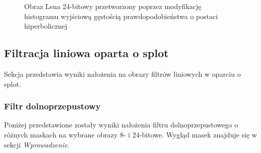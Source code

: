 \documentclass{classrep}
\begin{document}
\begin{figure}[H]%
    \centering
    \qquad
    \qquad
    \qquad
    \caption{Obraz Lena 24-bitowy przetworzony poprzez modyfikację histogramu wyjściową gęstością prawdopodobieństwa o postaci hiperbolicznej}%
\end{figure}

\subsection{Filtracja liniowa oparta o splot}
Sekcja przedstawia wyniki nałożenia na obrazy filtrów liniowych w oparciu o splot.

\subsubsection{Filtr dolnoprzepustowy}
Poniżej przedstawione zostały wyniki nałożenia filtru dolnoprzepustowego o różnych maskach na wybrane obrazy 8- i 24-bitowe. Wygląd masek znajduje się w sekcji \textit{Wprowadzenie}.
\end{document}
